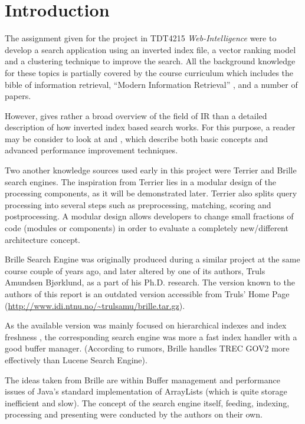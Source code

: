 \chapter{Introduction}
\thispagestyle{fancy}
\label{sec:introduction}

The assignment given for the project in TDT4215 {\it Web-Intelligence} were to develop a search application using an inverted index file, a vector ranking model and a clustering technique to improve the search. All the background knowledge for these topics is partially covered by the course curriculum which includes the bible of information retrieval, ``Modern Information Retrieval'' \cite{553876}, and a number of papers.

However, \cite{553876} gives rather a broad overview of the field of IR than a detailed description of how inverted index based search works. For this purpose, a reader may be consider to look at \cite{1132959} and \cite{323905}, which describe both basic concepts and advanced performance improvement techniques.

Two another knowledge sources used early in this project were Terrier \cite{ounis06terrier-osir} and Brille \cite{truls} search engines. The inspiration from Terrier lies in a modular design of the processing components, as it will be demonstrated later. Terrier also splits query processing into several steps such as preprocessing, matching, scoring and postprocessing. A modular design allows developers to change small fractions of code (modules or components) in order to evaluate a completely new/different architecture concept.

Brille Search Engine was originally produced during a similar project at the same course couple of years ago, and later altered by one of its authors, Truls Amundsen Bjørklund, as a part of his Ph.D. research. The version known to the authors of this report is an outdated version accessible from Truls' Home Page (\url{http://www.idi.ntnu.no/~trulsamu/brille.tar.gz}).

As the available version was mainly focused on hierarchical indexes and index freshness \cite{truls}, the corresponding search engine was more a fast index handler with a good buffer manager. (According to rumors, Brille handles TREC GOV2 more effectively than Lucene Search Engine).

The ideas taken from Brille are within Buffer management and performance issues of Java's standard implementation of ArrayLists (which is quite storage inefficient and slow). The concept of the search engine itself, feeding, indexing, processing and presenting were conducted by the authors on their own.

